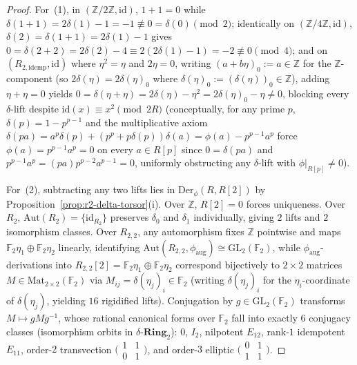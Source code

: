 \documentclass[10pt,twoside,openright]{book}
\theoremstyle{crmplain}
\theoremstyle{crmdef}
\theoremstyle{crmremark}
\begin{document}
\begin{proof}
For~(1), in $(\mathbb{Z}/2\mathbb{Z}, \mathrm{id})$, $1 + 1 = 0$ while $\delta(1+1) = 2\delta(1) - 1 = -1 \not\equiv 0 = \delta(0) \pmod 2$; identically on $(\mathbb{Z}/4\mathbb{Z}, \mathrm{id})$, $\delta(2) = \delta(1+1) = 2\delta(1) - 1$ gives $0 = \delta(2+2) = 2\delta(2) - 4 \equiv 2(2\delta(1) - 1) = -2 \not\equiv 0 \pmod 4$; and on $(R_{2,\mathrm{idemp}}, \mathrm{id})$ where $\eta^2 = \eta$ and $2\eta = 0$, writing $(a + b\eta)_0 := a \in \mathbb{Z}$ for the $\mathbb{Z}$-component (so $2\delta(\eta) = 2\delta(\eta)_0$ where $\delta(\eta)_0 := (\delta(\eta))_0 \in \mathbb{Z}$), adding $\eta + \eta = 0$ yields $0 = \delta(\eta + \eta) = 2\delta(\eta) - \eta^2 = 2\delta(\eta)_0 - \eta \neq 0$, blocking every $\delta$-lift despite $\mathrm{id}(x) \equiv x^2 \pmod{2R}$ (conceptually, for any prime $p$, $\delta(p) = 1 - p^{p-1}$ and the multiplicative axiom $\delta(pa) = a^p\delta(p) + (p^p + p\delta(p))\delta(a) = \phi(a) - p^{p-1}a^p$ force $\phi(a) = p^{p-1}a^p = 0$ on every $a \in R[p]$ since $0 = \delta(pa)$ and $p^{p-1}a^p = (pa)p^{p-2}a^{p-1} = 0$, uniformly obstructing any $\delta$-lift with $\phi|_{R[p]} \neq 0$).

For~(2), subtracting any two lifts lies in $\mathrm{Der}_\phi(R, R[2])$ by Proposition~\ref{prop:r2-delta-torsor}(i). Over $\mathbb{Z}$, $R[2]=0$ forces uniqueness. Over $R_2$, $\mathrm{Aut}(R_2) = \{\mathrm{id}_{R_2}\}$ preserves $\delta_0$ and $\delta_1$ individually, giving $2$ lifts and $2$ isomorphism classes. Over $R_{2,2}$, any automorphism fixes $\mathbb{Z}$ pointwise and maps $\mathbb{F}_2\eta_1 \oplus \mathbb{F}_2\eta_2$ linearly, identifying $\mathrm{Aut}(R_{2,2}, \phi_{\mathrm{aug}}) \cong \mathrm{GL}_2(\mathbb{F}_2)$, while $\phi_{\mathrm{aug}}$-derivations into $R_{2,2}[2] = \mathbb{F}_2\eta_1 \oplus \mathbb{F}_2\eta_2$ correspond bijectively to $2 \times 2$ matrices $M \in \mathrm{Mat}_{2\times 2}(\mathbb{F}_2)$ via $M_{ij} = \delta(\eta_j)_i \in \mathbb{F}_2$ (writing $\delta(\eta_j)_i$ for the $\eta_i$-coordinate of $\delta(\eta_j)$, yielding $16$ rigidified lifts). Conjugation by $g \in \mathrm{GL}_2(\mathbb{F}_2)$ transforms $M \mapsto g M g^{-1}$, whose rational canonical forms over $\mathbb{F}_2$ fall into exactly $6$ conjugacy classes (isomorphism orbits in $\delta\text{-}\mathbf{Ring}_2$): $0$, $I_2$, nilpotent $E_{12}$, rank-$1$ idempotent $E_{11}$, order-$2$ transvection $\bigl(\begin{smallmatrix}1 & 1\\ 0 & 1\end{smallmatrix}\bigr)$, and order-$3$ elliptic $\bigl(\begin{smallmatrix}0 & 1\\ 1 & 1\end{smallmatrix}\bigr)$.
\end{proof}
\end{document}
